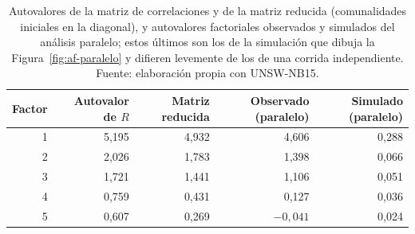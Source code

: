 \begin{table}[htbp]
  \centering
  \caption[Autovalores observados y simulados]{Autovalores de la matriz de correlaciones y de la matriz reducida (comunalidades iniciales en la diagonal), y autovalores factoriales observados y simulados del análisis paralelo; estos últimos son los de la simulación que dibuja la Figura~\ref{fig:af-paralelo} y difieren levemente de los de una corrida independiente. Fuente: elaboración propia con UNSW-NB15.}\label{tab:a-af-autovalores}
  \begin{tablacompacta}
  \begin{tabular}{@{}rrrrr@{}}
  \toprule
  Factor & Autovalor de $R$ & Matriz reducida & Observado (paralelo) & Simulado (paralelo) \\
  \midrule
  1 & 5,195 & 4,932 & 4,606 & 0,288 \\
  2 & 2,026 & 1,783 & 1,398 & 0,066 \\
  3 & 1,721 & 1,441 & 1,106 & 0,051 \\
  4 & 0,759 & 0,431 & 0,127 & 0,036 \\
  5 & 0,607 & 0,269 & $-0{,}041$ & 0,024 \\
  \bottomrule
  \end{tabular}
  \end{tablacompacta}
\end{table}
\FloatBarrier

